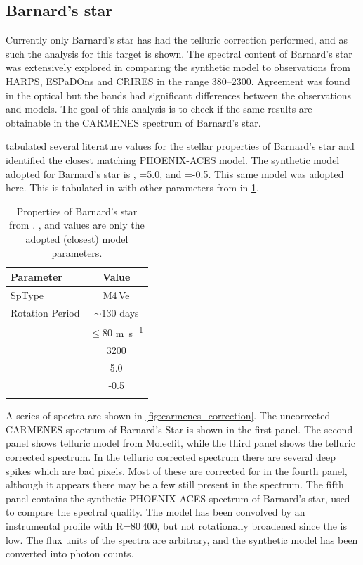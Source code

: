 \subsection{Barnard's star}
\label{sec:carmenes_barnards_star}
Currently only Barnard's star has had the telluric correction performed, and as such the analysis for this target is shown.
The spectral content of Barnard's star was extensively explored in \citet{artigau_optical_2018} comparing the synthetic model to observations from {HARPS}, {ESPaDOns} and {CRIRES} in the range 380--2300\nm{}.
Agreement was found in the optical but the \nir{} bands had significant differences between the observations and models. 
The goal of this analysis is to check if the same results are obtainable in the {CARMENES} spectrum of Barnard's star.

\citep{artigau_optical_2018} tabulated several literature values for the stellar properties of Barnard's star and identified the closest matching {PHOENIX-ACES} model.
The synthetic model adopted for Barnard's star is \K{}, \Logg{}=5.0, and \feh{}=-0.5.
This same model was adopted here.
This is tabulated in with other parameters from \citet{artigau_optical_2018} in \cref{tab:barnards_star_params}.

\begin{table}
    \caption{Properties of Barnard's star from \citep{artigau_optical_2018}. \Teff{}, \feh{} and \Logg{} values are only the adopted (closest) model parameters.}
    \begin{tabular}{lc}
        \centering
        \toprule
        Parameter & Value \\
        \midrule
        SpType & M4\,Ve \\
        Rotation Period & \(\sim\)130 days \\
        \Vsini{} & \(\le 80\) \si{\metre\per\second} \\
        \Teff{} & 3200 \K{} \\
        \Logg{} & 5.0 \\
        \feh{} & -0.5 \\
        \bottomrule{}
    \end{tabular}\label{tab:barnards_star_params}
\end{table}

A series of spectra are shown in \cref{fig:carmenes_correction}.
The uncorrected {CARMENES} spectrum of Barnard's Star is shown in the first panel.
The second panel shows telluric model from Molecfit, while the third panel shows the telluric corrected spectrum.
In the telluric corrected spectrum there are several deep spikes which are bad pixels.
Most of these are corrected for in the fourth panel, although it appears there may be a few still present in the spectrum.
The fifth panel contains the synthetic PHOENIX-ACES spectrum of Barnard's star, used to compare the spectral quality.
The model has been convolved by an instrumental profile with R=80\,400, but not rotationally broadened since the \Vsini{} is low. The flux units of the spectra are arbitrary, and the synthetic model has been converted into photon counts.


